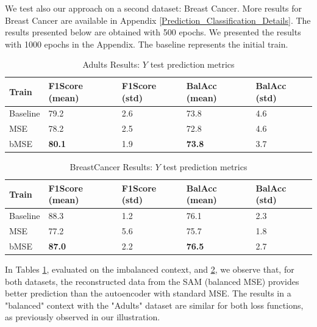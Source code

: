 \documentclass{article}
\theoremstyle{definition}
\begin{document}
We test also our approach on a second dataset: Breast Cancer. 
More results for Breast Cancer are available in Appendix \ref{Prediction_Classification_Details}. The results presented below are obtained with 500 epochs. We presented the results with 1000 epochs in the Appendix. The baseline represents the initial train.



\begin{table}[h!]
\centering
\begin{tabular}{|p{1.5cm}||p{1cm}|p{1cm}||p{1cm}|p{1cm}|} 
\hline
Train & F1Score (mean) & F1Score (std) & BalAcc (mean) & BalAcc (std)\\ [0.5ex] 
\hline\hline
Baseline & 79.2 & 2.6 &  73.8 & 4.6 \\ 
\hline
MSE & 78.2 & 2.5 &  72.8 & 4.6\\
\hline
bMSE & \textbf{80.1} & 1.9 & \textbf{73.8} & 3.7 \\
\hline
\end{tabular}
\caption{Adults Results: $Y$ test prediction metrics}
     \label{Prediction_Adults1}
\end{table}




\begin{table}[h!]
\centering
\begin{tabular}{|p{1.5cm}||p{1cm}|p{1cm}||p{1cm}|p{1cm}|} 
\hline
Train & F1Score (mean) & F1Score (std) & BalAcc (mean) & BalAcc (std)\\ [0.5ex] 
\hline\hline
Baseline & 88.3 & 1.2 & 76.1 & 2.3 \\ 
\hline
MSE & 77.2 & 5.6  & 75.7 & 1.8 \\
\hline
bMSE &  \textbf{87.0} & 2.2  & \textbf{76.5} & 2.7 \\
\hline
\end{tabular}
\caption{BreastCancer Results: $Y$ test prediction metrics}
     \label{Prediction_BreastCancer1}
\end{table}

In Tables \ref{Prediction_Adults1}, evaluated on the imbalanced context, and \ref{Prediction_BreastCancer1}, we observe that, for both datasets, the reconstructed data from the SAM (balanced MSE) provides better prediction than the autoencoder with standard MSE. The results in a "balanced" context with the "Adults" dataset are similar for both loss functions, as previously observed in our illustration.  
\end{document}
